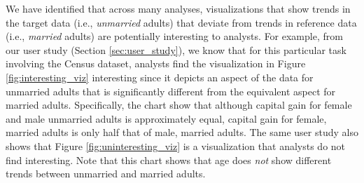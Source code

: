 \begin{example}
We have identified that across many analyses, 
visualizations that show trends in the target 
data (i.e., {\em unmarried} adults) that 
deviate from trends in reference data (i.e., {\em married}
adults) are potentially interesting to analysts.
For example, 
from our user study (Section \ref{sec:user_study}), 
we know that for this particular task involving the Census dataset,
analysts find the visualization in Figure \ref{fig:interesting_viz} 
interesting since it depicts an aspect of the data for unmarried adults 
that is significantly different from the equivalent aspect
for married adults.
Specifically, the chart show that although capital gain 
for female and male unmarried adults 
is approximately equal, capital gain for female, 
married adults is only half that of male, 
married adults.
The same user study also shows that Figure \ref{fig:uninteresting_viz} 
is a visualization that 
analysts do not find interesting. 
Note that this chart shows that age does {\em not} show different trends between unmarried
and married adults.
\end{example}


